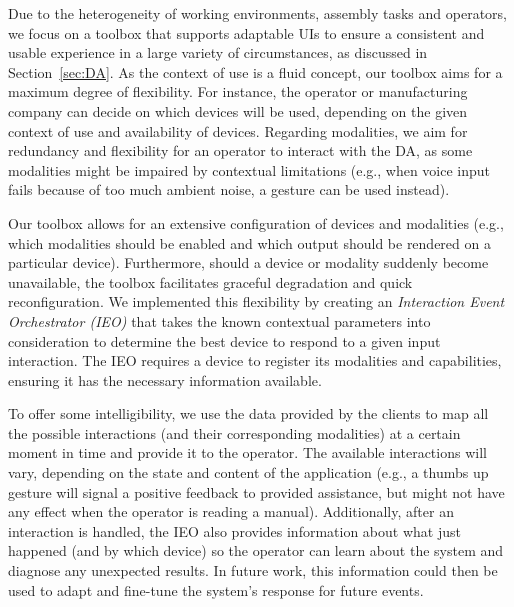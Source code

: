 Due to the heterogeneity of working environments, assembly tasks and operators, we focus on a toolbox that supports adaptable UIs to ensure a consistent and usable experience in a large variety of circumstances, as discussed in Section~\ref{sec:DA}. As the context of use is a fluid concept, our toolbox aims for a maximum degree of flexibility. For instance, the operator or manufacturing company can decide on which devices will be used, depending on the given context of use and availability of devices. Regarding modalities, we aim for redundancy and flexibility for an operator to interact with the DA, as some modalities might be impaired by contextual limitations (e.g., when voice input fails because of too much ambient noise, a gesture can be used instead).

Our toolbox allows for an extensive configuration of devices and modalities (e.g., which modalities should be enabled and which output should be rendered on a particular device). Furthermore, should a device or modality suddenly become unavailable, the toolbox facilitates graceful degradation and quick reconfiguration. We implemented this flexibility by creating an \emph{Interaction Event Orchestrator (IEO)} that takes the known contextual parameters into consideration to determine the best device to respond to a given input interaction. The IEO requires a device to register its modalities and capabilities, ensuring it has the necessary information available.

To offer some intelligibility, we use the data provided by the clients to map all the possible interactions (and their corresponding modalities) at a certain moment in time and provide it to the operator. The available interactions will vary, depending on the state and content of the application (e.g., a thumbs up gesture will signal a positive feedback to provided assistance, but might not have any effect when the operator is reading a manual). 
Additionally, after an interaction is handled, the IEO also provides information about what just happened (and by which device) so the operator can learn about the system and diagnose any unexpected results. In future work, this information could then be used to adapt and fine-tune the system's response for future events.

